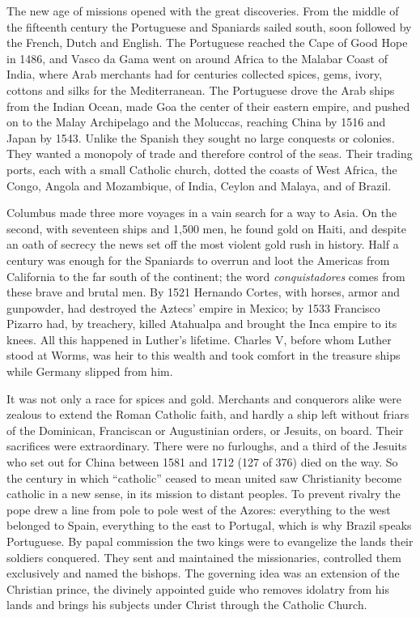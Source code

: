 The new age of missions opened with the great discoveries. From the middle of the fifteenth century
the Portuguese and Spaniards sailed south, soon followed by the French, Dutch and English. The
Portuguese reached the Cape of Good Hope in 1486, and Vasco da Gama went on around Africa to the
Malabar Coast of India, where Arab merchants had for centuries collected spices, gems, ivory, cottons
and silks for the Mediterranean. The Portuguese drove the Arab ships from the Indian Ocean, made Goa
the center of their eastern empire, and pushed on to the Malay Archipelago and the Moluccas, reaching
China by 1516 and Japan by 1543. Unlike the Spanish they sought no large conquests or colonies. They
wanted a monopoly of trade and therefore control of the seas. Their trading ports, each with a small Catholic church, dotted the coasts of West Africa, the Congo, Angola and Mozambique, of India, Ceylon and Malaya, and of Brazil.

Columbus made three more voyages in a vain search for a way to Asia. On the second, with seventeen
ships and 1,500 men, he found gold on Haiti, and despite an oath of secrecy the news set off the most
violent gold rush in history. Half a century was enough for the Spaniards to overrun and loot the Americas from California to the far south of the continent; the word \emph{conquistadores} comes from these
brave and brutal men. By 1521 Hernando Cortes, with horses, armor and gunpowder, had destroyed the
Aztecs' empire in Mexico; by 1533 Francisco Pizarro had, by treachery, killed Atahualpa and brought
the Inca empire to its knees. All this happened in Luther's lifetime. Charles V, before whom Luther
stood at Worms, was heir to this wealth and took comfort in the treasure ships while Germany slipped
from him.

It was not only a race for spices and gold. Merchants and conquerors alike were zealous to extend the
Roman Catholic faith, and hardly a ship left without friars of the Dominican, Franciscan or Augustinian orders, or Jesuits, on board. Their sacrifices were extraordinary. There were no furloughs, and a third of the Jesuits who set out for China between 1581 and 1712 (127 of 376) died on the way. So the century in which ``catholic'' ceased to mean
united saw Christianity become catholic in a new sense, in its mission to distant peoples. To prevent
rivalry the pope drew a line from pole to pole west of the Azores: everything to the west belonged to
Spain, everything to the east to Portugal, which is why Brazil speaks Portuguese. By papal commission
the two kings were to evangelize the lands their soldiers conquered. They sent and maintained the
missionaries, controlled them exclusively and named the bishops. The governing idea was an extension
of the Christian prince, the divinely appointed guide who removes idolatry from his lands and brings
his subjects under Christ through the Catholic Church.

